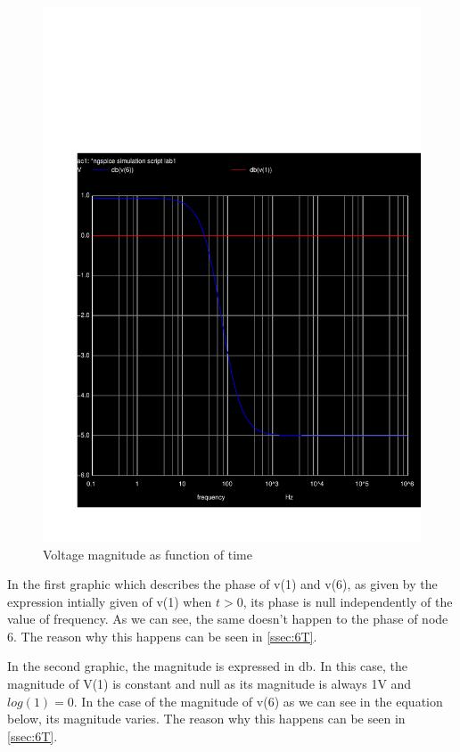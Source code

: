 \begin{figure}[h] \centering
\includegraphics[width=0.6\linewidth]{teste_5_db.pdf}
\caption{Voltage magnitude as function of time}
\label{fig:db(v(1)) db(v(6))}
\end{figure}

\par In the first graphic which describes the phase of v(1) and v(6), as given by the expression intially given of v(1) when $t>0$, its phase is null independently of the value of frequency.  As we can see, the same doesn't happen to the phase of node 6. The reason why this happens can be seen in \ref{ssec:6T}.

\par In the second graphic, the magnitude is expressed in db. In this case, the magnitude of V(1) is constant and null as its magnitude is always 1V and $log(1)=0$. In the case of the magnitude of v(6) as we can see in the equation below, its magnitude varies. The reason why this happens can be seen in \ref{ssec:6T}. 


 
